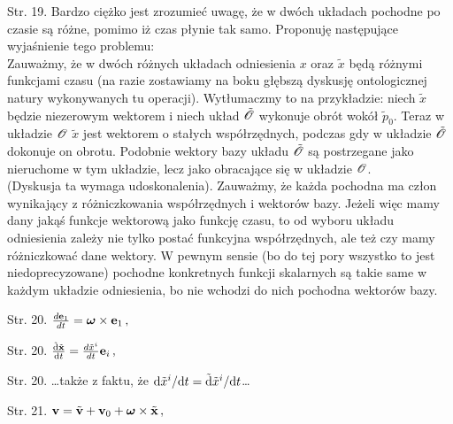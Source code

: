 \documentclass[a4paper,11pt]{article}
\begin{document}




\start {}

\vspace{\spaceFour}



\start Str. 19. Bardzo ciężko jest zrozumieć uwagę, że w dwóch układach pochodne po czasie są różne, pomimo iż czas płynie tak samo. Proponuję następujące wyjaśnienie tego problemu: \\
Zauważmy, że w dwóch różnych układach odniesienia $x$ oraz
$\tilde{ x }$ będą różnymi funkcjami czasu (na razie zostawiamy na
boku głębszą dyskusję ontologicznej natury wykonywanych tu operacji).
Wytłumaczmy to na przykładzie: niech $\tilde{ x }$ będzie niezerowym
wektorem i niech układ $\tilde{ \mathcal{O} }$ wykonuje obrót wokół
$\tilde{ p }_{ 0 }$. Teraz w układzie $\mathcal{O}$ $\tilde{ x }$
jest wektorem o stałych współrzędnych, podczas gdy w układzie
$\tilde{ \mathcal{O} }$ dokonuje on obrotu. Podobnie wektory bazy
układu $\tilde{ \mathcal{O} }$ są postrzegane jako nieruchome w tym
układzie, lecz jako obracające się w
układzie $\mathcal{O}$. \\
(Dyskusja ta wymaga udoskonalenia). Zauważmy, że każda pochodna ma
człon wynikający z różniczkowania współrzędnych i wektorów bazy.
Jeżeli więc mamy dany jakąś funkcje wektorową jako funkcję czasu, to
od wyboru układu odniesienia zależy nie tylko postać funkcyjna
współrzędnych, ale też czy mamy różniczkować dane wektory. W pewnym
sensie (bo do tej pory wszystko to jest niedoprecyzowane) pochodne
konkretnych funkcji skalarnych są takie same w każdym układzie
odniesienia, bo nie wchodzi do nich pochodna wektorów bazy.



Str. 20.
$\frac{ d\mathbf{e}_{ 1 } }{ dt } = \boldsymbol{\omega} \times
\mathbf{e}_{ 1 } \, ,$

Str. 20.
$\frac{ \tilde{ \mathrm{d} } \tilde{ \mathbf{x} } }{ \mathrm{d} t }
= \frac{ d\tilde{ x }^{ i } }{ dt } \mathbf{e}_{ i } \, ,$

Str. 20. \ldots także z faktu, że
$\mathrm{d} \tilde{ x }^{ i } / \mathrm{d} t = \tilde{ \mathrm{d} } \tilde{ x
}^{ i } / \mathrm{d} t$\ldots

Str. 21.
$\mathbf{v} = \tilde{ \mathbf{v} } + \mathbf{v}_{ 0 } +
\boldsymbol{\omega} \times \tilde{ \mathbf{x} } \, ,$
\end{document}
